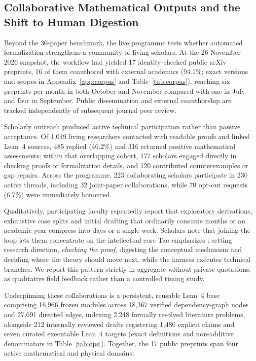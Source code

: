 \documentclass[11pt,a4paper]{article}
\begin{document}
\FloatBarrier

\subsection{Collaborative Mathematical Outputs and the Shift to Human Digestion}
\label{sec:scholars}
\label{sec:production}
Beyond the 30-paper benchmark, the live programme tests whether automated
formalization strengthens a community of living scholars. At the 26 November
2026 snapshot, the workflow had yielded 17 identity-checked public arXiv
preprints, 16 of them coauthored with external academics (94.1\%; exact
versions and scopes in Appendix~\ref{app:corpus} and Table~\ref{tab:corpus}),
reaching six preprints per month in both October and November compared with one
in July and four in September. Public dissemination and external coauthorship
are tracked independently of subsequent journal peer review.

Scholarly outreach produced active technical participation rather than passive
acceptance. Of 1,049 living researchers contacted with readable proofs and
linked Lean~4 sources, 485 replied (46.2\%) and 316 returned positive
mathematical assessments; within that overlapping cohort, 177 scholars engaged
directly in checking proofs or formalization details, and 120 contributed
counterexamples or gap repairs. Across the programme, 223 collaborating
scholars participate in 230 active threads, including 32 joint-paper
collaborations, while 70 opt-out requests (6.7\%) were immediately honoured.

Qualitatively, participating faculty repeatedly report that exploratory
derivations, exhaustive case splits and initial drafting that ordinarily
consume months or an academic year compress into days or a single week.
Scholars note that joining the loop lets them concentrate on the intellectual
core Tao emphasizes \citep{tao2026age}: setting research direction,
\emph{checking the proof}, digesting the conceptual mechanism and deciding
where the theory should move next, while the harness executes technical
branches. We report this pattern strictly in aggregate without private
quotations, as qualitative field feedback rather than a controlled timing
study.

Underpinning these collaborations is a persistent, reusable Lean~4 base
comprising 16,966 frozen modules across 18,367 verified dependency-graph nodes
and 27,691 directed edges, indexing 2,248 formally resolved literature
problems, alongside 212 internally reviewed drafts registering 1,480 explicit
claims and seven curated executable Lean~4 targets (exact definitions and
non-additive denominators in Table~\ref{tab:ops}). Together, the 17 public
preprints span four active mathematical and physical domains:
\end{document}
